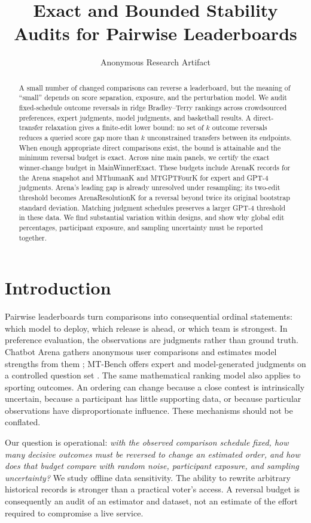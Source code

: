 \documentclass{article}
\title{Exact and Bounded Stability Audits for Pairwise Leaderboards}
\author{Anonymous Research Artifact}
\newcommand{\num}[1]{\csname #1\endcsname}
\begin{document}
\maketitle
\begin{abstract}
A small number of changed comparisons can reverse a leaderboard, but the meaning of ``small'' depends on score separation, exposure, and the perturbation model. We audit fixed-schedule outcome reversals in ridge Bradley--Terry rankings across crowdsourced preferences, expert judgments, model judgments, and basketball results. A direct-transfer relaxation gives a finite-edit lower bound: no set of $k$ outcome reversals reduces a queried score gap more than $k$ unconstrained transfers between its endpoints. When enough appropriate direct comparisons exist, the bound is attainable and the minimum reversal budget is exact. Across nine main panels, we certify the exact winner-change budget in \num{MainWinnerExact}. These budgets include \num{ArenaK} records for the Arena snapshot and \num{MThumanK} and \num{MTGPTFourK} for expert and GPT-4 judgments. Arena's leading gap is already unresolved under resampling; its two-edit threshold becomes \num{ArenaResolutionK} for a reversal beyond twice its original bootstrap standard deviation. Matching judgment schedules preserves a larger GPT-4 threshold in these data. We find substantial variation within designs, and show why global edit percentages, participant exposure, and sampling uncertainty must be reported together.
\end{abstract}

\section{Introduction}
Pairwise leaderboards turn comparisons into consequential ordinal statements: which model to deploy, which release is ahead, or which team is strongest. In preference evaluation, the observations are judgments rather than ground truth. Chatbot Arena gathers anonymous user comparisons and estimates model strengths from them \citep{chiang2024arena}; MT-Bench offers expert and model-generated judgments on a controlled question set \citep{zheng2023judge}. The same mathematical ranking model also applies to sporting outcomes. An ordering can change because a close contest is intrinsically uncertain, because a participant has little supporting data, or because particular observations have disproportionate influence. These mechanisms should not be conflated.

Our question is operational: \emph{with the observed comparison schedule fixed, how many decisive outcomes must be reversed to change an estimated order, and how does that budget compare with random noise, participant exposure, and sampling uncertainty?} We study offline data sensitivity. The ability to rewrite arbitrary historical records is stronger than a practical voter's access. A reversal budget is consequently an audit of an estimator and dataset, not an estimate of the effort required to compromise a live service.
\end{document}
